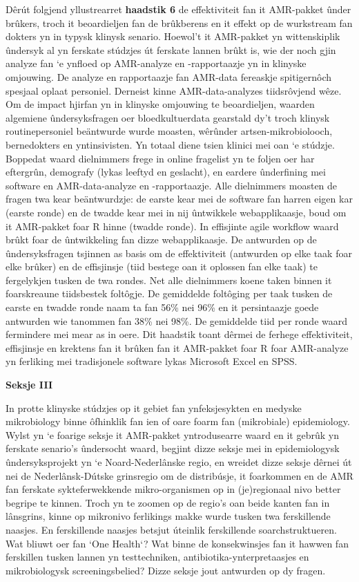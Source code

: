 \documentclass[
]{book}
\begin{document}
Dêrút folgjend yllustrearret \textbf{haadstik 6} de effektiviteit fan it AMR-pakket ûnder brûkers, troch it beoardieljen fan de brûkberens en it effekt op de wurkstream fan dokters yn in typysk klinysk senario. Hoewol't it AMR-pakket yn wittenskiplik ûndersyk al yn ferskate stúdzjes út ferskate lannen brûkt is, wie der noch gjin analyze fan `e ynfloed op AMR-analyze en -rapportaazje yn in klinyske omjouwing. De analyze en rapportaazje fan AMR-data fereaskje spitigernôch spesjaal oplaat personiel. Derneist kinne AMR-data-analyzes tiidsrôvjend wêze. Om de impact hjirfan yn in klinyske omjouwing te beoardieljen, waarden algemiene ûndersyksfragen oer bloedkultuerdata gearstald dy't troch klinysk routinepersoniel beäntwurde wurde moasten, wêrûnder artsen-mikrobiolooch, bernedokters en yntinsivisten. Yn totaal diene tsien klinici mei oan `e stúdzje. Boppedat waard dielnimmers frege in online fragelist yn te foljen oer har eftergrûn, demografy (lykas leeftyd en geslacht), en eardere ûnderfining mei software en AMR-data-analyze en -rapportaazje. Alle dielnimmers moasten de fragen twa kear beäntwurdzje: de earste kear mei de software fan harren eigen kar (earste ronde) en de twadde kear mei in nij ûntwikkele webapplikaasje, boud om it AMR-pakket foar R hinne (twadde ronde). In effisjinte agile workflow waard brûkt foar de ûntwikkeling fan dizze webapplikaasje. De antwurden op de ûndersyksfragen tsjinnen as basis om de effektiviteit (antwurden op elke taak foar elke brûker) en de effisjinsje (tiid bestege oan it oplossen fan elke taak) te fergelykjen tusken de twa rondes. Net alle dielnimmers koene taken binnen it foarskreaune tiidsbestek foltôgje. De gemiddelde foltôging per taak tusken de earste en twadde ronde naam ta fan 56\% nei 96\% en it persintaazje goede antwurden wie tanommen fan 38\% nei 98\%. De gemiddelde tiid per ronde waard fermindere mei mear as in oere. Dit haadstik toant dêrmei de ferhege effektiviteit, effisjinsje en krektens fan it brûken fan it AMR-pakket foar R foar AMR-analyze yn ferliking mei tradisjonele software lykas Microsoft Excel en SPSS.

\textbf{Seksje III}

In protte klinyske stúdzjes op it gebiet fan ynfeksjesykten en medyske mikrobiology binne ôfhinklik fan ien of oare foarm fan (mikrobiale) epidemiology. Wylst yn `e foarige seksje it AMR-pakket yntrodusearre waard en it gebrûk yn ferskate senario's ûndersocht waard, begjint dizze seksje mei in epidemiologysk ûndersyksprojekt yn `e Noard-Nederlânske regio, en wreidet dizze seksje dêrnei út nei de Nederlânsk-Dútske grinsregio om de distribúsje, it foarkommen en de AMR fan ferskate sykteferwekkende mikro-organismen op in (je)regionaal nivo better begripe te kinnen. Troch yn te zoomen op de regio's oan beide kanten fan in lânsgrins, kinne op mikronivo ferlikings makke wurde tusken twa ferskillende naasjes. En ferskillende naasjes betsjut úteinlik ferskillende soarchstruktueren. Wat bliuwt oer fan `One Health`? Wat binne de konsekwinsjes fan it hawwen fan ferskillen tusken lannen yn testtechniken, antibiotika-ynterpretaasjes en mikrobiologysk screeningsbelied? Dizze seksje jout antwurden op dy fragen.
\end{document}
